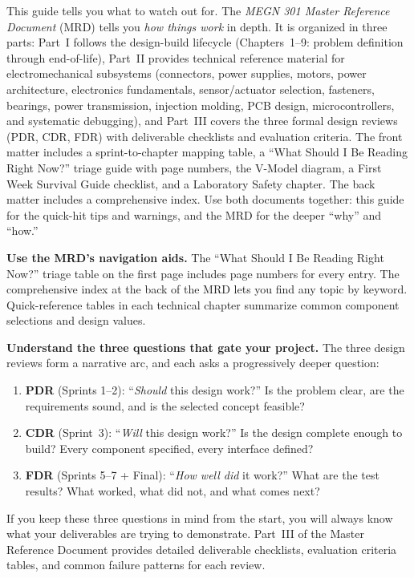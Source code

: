 This guide tells you what to watch out for. The \textit{MEGN 301 Master Reference Document} (MRD) tells you \textit{how things work} in depth. It is organized in three parts: Part~I follows the design-build lifecycle (Chapters~1--9: problem definition through end-of-life), Part~II provides technical reference material for electromechanical subsystems (connectors, power supplies, motors, power architecture, electronics fundamentals, sensor/actuator selection, fasteners, bearings, power transmission, injection molding, PCB design, microcontrollers, and systematic debugging), and Part~III covers the three formal design reviews (PDR, CDR, FDR) with deliverable checklists and evaluation criteria. The front matter includes a sprint-to-chapter mapping table, a ``What Should I Be Reading Right Now?'' triage guide with page numbers, the V-Model diagram, a First Week Survival Guide checklist, and a Laboratory Safety chapter. The back matter includes a comprehensive index. Use both documents together: this guide for the quick-hit tips and warnings, and the MRD for the deeper ``why'' and ``how.''

\begin{protip}
\textbf{Use the MRD's navigation aids.} The ``What Should I Be Reading Right Now?'' triage table on the first page includes page numbers for every entry. The comprehensive index at the back of the MRD lets you find any topic by keyword. Quick-reference tables in each technical chapter summarize common component selections and design values.
\end{protip}

\begin{protip}
\textbf{Understand the three questions that gate your project.} The three design reviews form a narrative arc, and each asks a progressively deeper question:
\begin{enumerate}[leftmargin=*, itemsep=1pt, topsep=0pt]
    \item \textbf{PDR} (Sprints 1--2): ``\textit{Should} this design work?'' Is the problem clear, are the requirements sound, and is the selected concept feasible?
    \item \textbf{CDR} (Sprint~3): ``\textit{Will} this design work?'' Is the design complete enough to build? Every component specified, every interface defined?
    \item \textbf{FDR} (Sprints 5--7 + Final): ``\textit{How well did} it work?'' What are the test results? What worked, what did not, and what comes next?
\end{enumerate}
If you keep these three questions in mind from the start, you will always know what your deliverables are trying to demonstrate. Part~III of the Master Reference Document provides detailed deliverable checklists, evaluation criteria tables, and common failure patterns for each review.
\end{protip}

